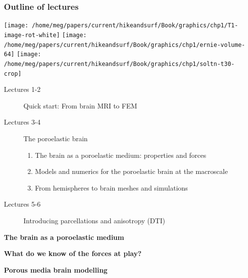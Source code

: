 \documentclass[10pt, mathserif, aspectratio=169, t]{beamer}
\newcommand{\mysection}[1]{\begin{frame} \begin{center} \vspace{3em} \textbf{#1} \end{center} \end{frame}}
\begin{document}
\begin{frame}
  \frametitle{Outline of lectures}
  \begin{center}
  \texttt{[image: /home/meg/papers/current/hikeandsurf/Book/graphics/chp1/T1-image-rot-white]}
  \texttt{[image: /home/meg/papers/current/hikeandsurf/Book/graphics/chp1/ernie-volume-64]}
  \texttt{[image: /home/meg/papers/current/hikeandsurf/Book/graphics/chp1/soltn-t30-crop]}
  \end{center}
  \begin{description}
    \item[Lectures 1-2] Quick start: From brain MRI to FEM
    \item[Lectures 3-4] The poroelastic brain  
      \begin{enumerate}[I]
      \item
        The brain as a poroelastic medium: properties and forces
      \item
        Models and numerics for the poroelastic brain at the macroscale
      \item
        From hemispheres to brain meshes and simulations
      \end{enumerate}
    \item[Lectures 5-6] Introducing parcellations and anisotropy (DTI)
  \end{description}
\end{frame}

\graphicspath{{/home/meg/presentations/slidesx/}}

\mysection{The brain as a poroelastic medium}







\mysection{What do we know of the forces at play?}




\mysection{Porous media brain modelling}




\end{document}
